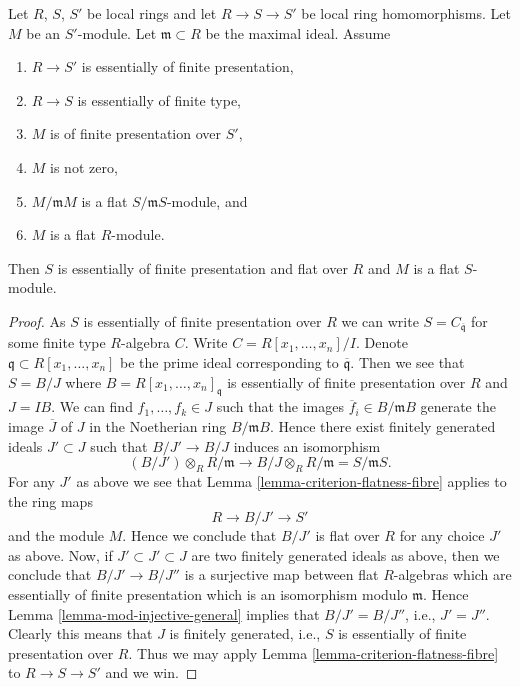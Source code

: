 \begin{lemma}
\label{lemma-criterion-flatness-fibre-fp-over-ft}
Let $R$, $S$, $S'$ be local rings and let $R \to S \to S'$ be local ring
homomorphisms. Let $M$ be an $S'$-module. Let $\mathfrak m \subset R$
be the maximal ideal. Assume
\begin{enumerate}
\item $R \to S'$ is essentially of finite presentation,
\item $R \to S$ is essentially of finite type,
\item $M$ is of finite presentation over $S'$,
\item $M$ is not zero,
\item $M/\mathfrak mM$ is a flat $S/\mathfrak mS$-module, and
\item $M$ is a flat $R$-module.
\end{enumerate}
Then $S$ is essentially of finite presentation and flat over $R$
and $M$ is a flat $S$-module.
\end{lemma}

\begin{proof}
As $S$ is essentially of finite presentation over $R$ we can write
$S = C_{\overline{\mathfrak q}}$ for some finite type $R$-algebra $C$.
Write $C = R[x_1, \ldots, x_n]/I$. Denote
$\mathfrak q \subset R[x_1, \ldots, x_n]$ be the prime ideal corresponding
to $\overline{\mathfrak q}$. Then we see that $S = B/J$ where
$B = R[x_1, \ldots, x_n]_{\mathfrak q}$ is essentially of finite presentation
over $R$ and $J = IB$. We can find $f_1, \ldots, f_k \in J$ such that
the images $\overline{f}_i \in B/\mathfrak mB$
generate the image $\overline{J}$ of $J$ in the Noetherian ring
$B/\mathfrak mB$. Hence there exist finitely generated ideals
$J' \subset J$ such that $B/J' \to B/J$ induces an isomorphism
$$
(B/J') \otimes_R R/\mathfrak m \longrightarrow
B/J \otimes_R R/\mathfrak m = S/\mathfrak mS.
$$
For any $J'$ as above we see that
Lemma \ref{lemma-criterion-flatness-fibre}
applies to the ring maps
$$
R \longrightarrow B/J' \longrightarrow S'
$$
and the module $M$. Hence we conclude that $B/J'$ is flat over $R$
for any choice $J'$ as above. Now, if $J' \subset J' \subset J$ are
two finitely generated ideals as above, then we conclude that
$B/J' \to B/J''$ is a surjective map between flat $R$-algebras
which are essentially of finite presentation which is an isomorphism
modulo $\mathfrak m$. Hence
Lemma \ref{lemma-mod-injective-general}
implies that $B/J' = B/J''$, i.e., $J' = J''$. Clearly this means that
$J$ is finitely generated, i.e., $S$ is essentially of finite presentation
over $R$. Thus we may apply
Lemma \ref{lemma-criterion-flatness-fibre}
to $R \to S \to S'$ and we win.
\end{proof}

